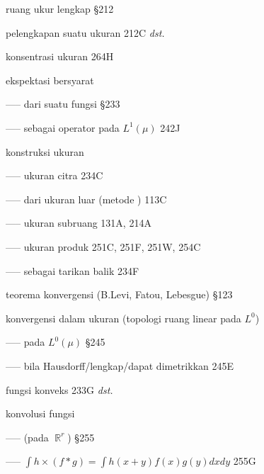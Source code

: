  ruang ukur lengkap \S212

 pelengkapan suatu ukuran 212C {\it dst.}




 konsentrasi ukuran 264H


 ekspektasi bersyarat

----- dari suatu fungsi \S233

----- sebagai operator pada $L^1(\mu)$ 242J

 konstruksi ukuran

----- ukuran citra 234C

----- dari ukuran luar (metode \Caratheodory) 113C

----- ukuran subruang 131A, 214A

----- ukuran produk 251C, 251F, 251W, 254C

















----- sebagai tarikan balik 234F


















 teorema konvergensi (B.Levi, Fatou, Lebesgue) \S123

konvergensi dalam ukuran (topologi ruang linear pada $L^0$)

----- pada $L^0(\mu)$ \S245



----- bila Hausdorff/lengkap/dapat dimetrikkan 245E






 fungsi konveks 233G {\it dst.}




 konvolusi fungsi

----- (pada $\BbbR^r$) \S255




----- $\int h\times(f*g)=\int h(x+y)f(x)g(y)dxdy$ 255G


